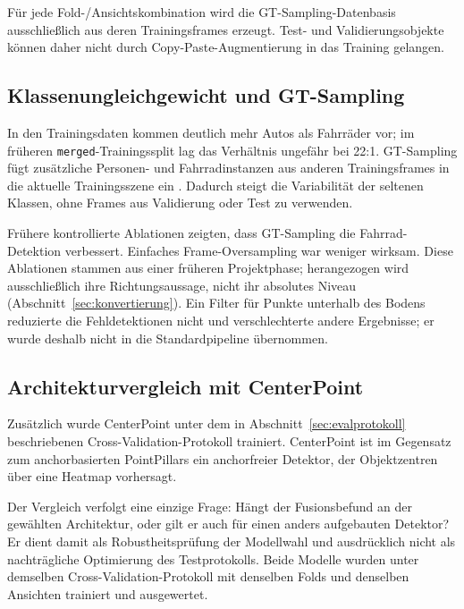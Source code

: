 Für jede Fold-/Ansichtskombination wird die GT-Sampling-Datenbasis ausschließlich aus deren Trainingsframes erzeugt. Test- und Validierungsobjekte können daher nicht durch Copy-Paste-Augmentierung in das Training gelangen.

\subsection{Klassenungleichgewicht und GT-Sampling}
\label{sec:gtsampling}

In den Trainingsdaten kommen deutlich mehr Autos als Fahrräder vor; im früheren \texttt{merged}-Trainingssplit lag das Verhältnis ungefähr bei 22:1. GT-Sampling fügt zusätzliche Personen- und Fahrradinstanzen aus anderen Trainingsframes in die aktuelle Trainingsszene ein \cite{ghiasi2021copypaste}. Dadurch steigt die Variabilität der seltenen Klassen, ohne Frames aus Validierung oder Test zu verwenden.

Frühere kontrollierte Ablationen zeigten, dass GT-Sampling die Fahrrad-Detektion verbessert. Einfaches Frame-Oversampling war weniger wirksam. Diese Ablationen stammen aus einer früheren Projektphase; herangezogen wird ausschließlich ihre Richtungsaussage, nicht ihr absolutes Niveau (Abschnitt~\ref{sec:konvertierung}). Ein Filter für Punkte unterhalb des Bodens reduzierte die Fehldetektionen nicht und verschlechterte andere Ergebnisse; er wurde deshalb nicht in die Standardpipeline übernommen.

\subsection{Architekturvergleich mit CenterPoint}
\label{sec:architekturvergleich}

Zusätzlich wurde CenterPoint \cite{yin2021centerpoint} unter dem in Abschnitt~\ref{sec:evalprotokoll} beschriebenen Cross-Validation-Protokoll trainiert. CenterPoint ist im Gegensatz zum anchorbasierten PointPillars ein anchorfreier Detektor, der Objektzentren über eine Heatmap vorhersagt.

Der Vergleich verfolgt eine einzige Frage: Hängt der Fusionsbefund an der gewählten Architektur, oder gilt er auch für einen anders aufgebauten Detektor? Er dient damit als Robustheitsprüfung der Modellwahl und ausdrücklich nicht als nachträgliche Optimierung des Testprotokolls. Beide Modelle wurden unter demselben Cross-Validation-Protokoll mit denselben Folds und denselben Ansichten trainiert und ausgewertet.

